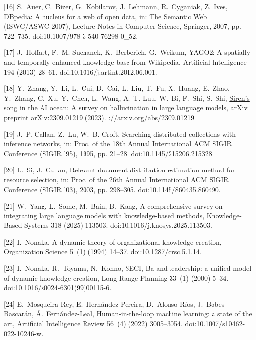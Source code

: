\documentclass[11pt]{article}
\begin{document}
[16] 
S.~Auer, C.~Bizer, G.~Kobilarov, J.~Lehmann, R.~Cyganiak, Z.~Ives, {DBpedia}: A
  nucleus for a web of open data, in: The Semantic Web (ISWC/ASWC 2007),
  Lecture Notes in Computer Science, Springer, 2007, pp. 722--735.
  doi:10.1007/978-3-540-76298-0_52.



[17] 
J.~Hoffart, F.~M. Suchanek, K.~Berberich, G.~Weikum, {YAGO2}: A spatially and
  temporally enhanced knowledge base from {Wikipedia}, Artificial Intelligence
  194 (2013) 28--61.
  doi:10.1016/j.artint.2012.06.001.



[18] 
Y.~Zhang, Y.~Li, L.~Cui, D.~Cai, L.~Liu, T.~Fu, X.~Huang, E.~Zhao, Y.~Zhang,
  C.~Xu, Y.~Chen, L.~Wang, A.~T. Luu, W.~Bi, F.~Shi, S.~Shi,
  \href{https://arxiv.org/abs/2309.01219}{Siren's song in the {AI} ocean: A
  survey on hallucination in large language models}, arXiv preprint
  arXiv:2309.01219 (2023).
\newlinehttps://arxiv.org/abs/2309.01219



[19] 
J.~P. Callan, Z.~Lu, W.~B. Croft, Searching distributed collections with
  inference networks, in: Proc. of the 18th Annual International ACM SIGIR
  Conference (SIGIR '95), 1995, pp. 21--28.
  doi:10.1145/215206.215328.



[20] 
L.~Si, J.~Callan, Relevant document distribution estimation method for resource
  selection, in: Proc. of the 26th Annual International ACM SIGIR Conference
  (SIGIR '03), 2003, pp. 298--305.
  doi:10.1145/860435.860490.



[21] 
W.~Yang, L.~Some, M.~Bain, B.~Kang, A comprehensive survey on integrating large
  language models with knowledge-based methods, Knowledge-Based Systems 318
  (2025) 113503.
  doi:10.1016/j.knosys.2025.113503.



[22] 
I.~Nonaka, A dynamic theory of organizational knowledge creation, Organization
  Science 5~(1) (1994) 14--37.
  doi:10.1287/orsc.5.1.14.



[23] 
I.~Nonaka, R.~Toyama, N.~Konno, {SECI}, {Ba} and leadership: a unified model of
  dynamic knowledge creation, Long Range Planning 33~(1) (2000) 5--34.
  doi:10.1016/s0024-6301(99)00115-6.



[24] 
E.~Mosqueira-Rey, E.~Hern{\'a}ndez-Pereira, D.~Alonso-R{\'i}os,
  J.~Bobes-Bascar{\'a}n, {\'A}.~Fern{\'a}ndez-Leal, Human-in-the-loop machine
  learning: a state of the art, Artificial Intelligence Review 56~(4) (2022)
  3005--3054.
  doi:10.1007/s10462-022-10246-w.
\end{document}
